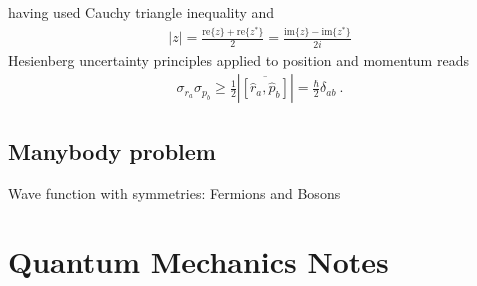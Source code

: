 \documentclass[letterpaper,10pt,english]{jupyterBook}
\begin{document}
\sphinxAtStartPar
having used Cauchy triangle inequality and
\begin{equation*}
\begin{split}|z| = \frac{\text{re}\{z\} + \text{re}\{z^*\}}{2} = \frac{\text{im}\{z\} - \text{im}\{z^*\}}{2i}\end{split}
\end{equation*}
\sphinxAtStartPar
Hesienberg uncertainty principles applied to position and momentum reads
\begin{equation*}
\begin{split}\sigma_{r_a} \sigma_{p_b} \ge \frac{1}{2} \left|\overline{[\hat{r}_a, \hat{p}_b]}\right| = \frac{\hbar}{2}  \delta_{ab} \ .\end{split}
\end{equation*}

\section{Many\sphinxhyphen{}body problem}
\label{\detokenize{ch/quantum-mechanics/intro:many-body-problem}}
\sphinxAtStartPar
Wave function with symmetries: Fermions and Bosons

\sphinxstepscope


\chapter{Quantum Mechanics \sphinxhyphen{} Notes}
\label{\detokenize{ch/quantum-mechanics/notes:quantum-mechanics-notes}}\label{\detokenize{ch/quantum-mechanics/notes:id1}}\label{\detokenize{ch/quantum-mechanics/notes::doc}}
\end{document}
